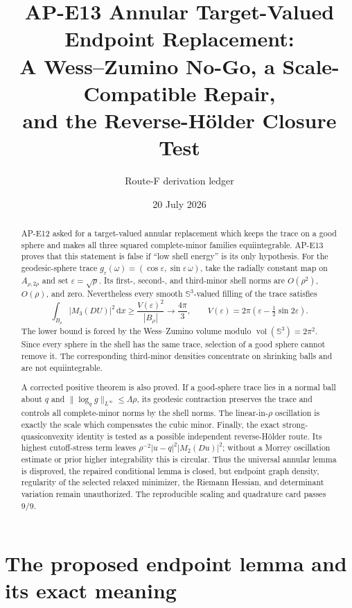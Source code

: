 \documentclass[11pt]{article}
\title{AP-E13 Annular Target-Valued Endpoint Replacement:\\
A Wess--Zumino No-Go, a Scale-Compatible Repair,\\
and the Reverse-H\"older Closure Test}
\author{Route-F derivation ledger}
\date{20 July 2026}
\newcommand{\dd}{\,\mathrm d}
\newcommand{\SSS}{\mathbb S}
\begin{document}
\maketitle

\begin{abstract}
AP-E12 asked for a target-valued annular replacement which keeps the trace on
a good sphere and makes all three squared complete-minor families
equiintegrable.  AP-E13 proves that this statement is false if ``low shell
energy'' is its only hypothesis.  For the geodesic-sphere trace
$g_\varepsilon(\omega)=(\cos\varepsilon,\sin\varepsilon\,\omega)$, take the
radially constant map on $A_{\rho,2\rho}$ and set
$\varepsilon=\sqrt\rho$.  Its first-, second-, and third-minor shell norms
are $O(\rho^2)$, $O(\rho)$, and zero.  Nevertheless every smooth
$\SSS^3$-valued filling of the trace satisfies
\[
 \int_{B_\rho}|M_3(DU)|^2\dd x
 \geq \frac{V(\varepsilon)^2}{|B_\rho|}
 \longrightarrow \frac{4\pi}{3},\qquad
 V(\varepsilon)=2\pi\left(\varepsilon-\tfrac12\sin2\varepsilon\right).
\]
The lower bound is forced by the Wess--Zumino volume modulo
$\operatorname{vol}(\SSS^3)=2\pi^2$.  Since every sphere in the shell has the
same trace, selection of a good sphere cannot remove it.  The corresponding
third-minor densities concentrate on shrinking balls and are not
equiintegrable.

A corrected positive theorem is also proved.  If a good-sphere trace lies in
a normal ball about $q$ and
$\|\log_q g\|_{L^\infty}\leq\Lambda\rho$, its geodesic contraction preserves
the trace and controls all complete-minor norms by the shell norms.  The
linear-in-$\rho$ oscillation is exactly the scale which compensates the cubic
minor.  Finally, the exact strong-quasiconvexity identity is tested as a
possible independent reverse-H\"older route.  Its highest cutoff-stress term
leaves $\rho^{-2}|u-q|^2|M_2(Du)|^2$; without a Morrey oscillation estimate or
prior higher integrability this is circular.  Thus the universal annular
lemma is disproved, the repaired conditional lemma is closed, but endpoint
graph density, regularity of the selected relaxed minimizer, the Riemann
Hessian, and determinant variation remain unauthorized.  The reproducible
scaling and quadrature card passes $9/9$.
\end{abstract}

\tableofcontents

\section{The proposed endpoint lemma and its exact meaning}
\end{document}
